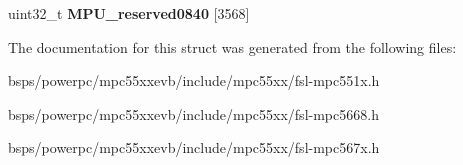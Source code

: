\begin{DoxyCompactItemize}
\begin{tabbing}
\end{tabbing}\item 
\mbox{\label{structMPU__tag_acb31ca83fecc5e35907cbf978987cc07}} 
uint32\+\_\+t {\bfseries M\+P\+U\+\_\+reserved0840} \mbox{[}3568\mbox{]}
\end{DoxyCompactItemize}


The documentation for this struct was generated from the following files\+:\begin{DoxyCompactItemize}
\item 
bsps/powerpc/mpc55xxevb/include/mpc55xx/fsl-\/mpc551x.\+h\item 
bsps/powerpc/mpc55xxevb/include/mpc55xx/fsl-\/mpc5668.\+h\item 
bsps/powerpc/mpc55xxevb/include/mpc55xx/fsl-\/mpc567x.\+h\end{DoxyCompactItemize}
